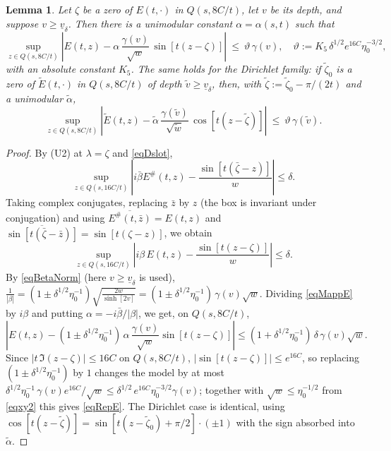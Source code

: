 \documentclass[11pt,twoside,reqno]{amsart}
\def\ti{\tilde}
\def\d{\delta}
\def\l{\lambda}
\def\g{\gamma}
\def\a{\alpha}
\def\b{\beta}
\def\uv{\underline{v}_{\d}}
\theoremstyle{plain}
\newtheorem{lemma}{Lemma}
\numberwithin{equation}{section}
\begin{document}
\begin{lemma}\label{lemRep}
Let $\zeta$ be a zero of $E(t,\cdot)$ in $Q(s,8C/t)$, let $v$ be its depth, and suppose $v\geq\uv$. Then there is a unimodular constant $\a=\a(s,t)$ such that
\begin{equation}
\sup_{z\in Q(s,8C/t)}\left|E(t,z)-\a\,\frac{\g(v)}{\sqrt{w}}\,\sin[t(z-\zeta)]\right|\ \leq\ \vartheta\,\g(v),
\quad
\vartheta:=K_5\,\d^{1/2}e^{16C}\eta_0^{-3/2},
\label{eqRepE}
\end{equation}
with an absolute constant $K_5$. The same holds for the Dirichlet family: if $\ti\zeta_0$ is a zero of $\ti E(t,\cdot)$ in $Q(s,8C/t)$ of depth $\ti v\geq\uv$, then, with $\ti\zeta:=\ti\zeta_0-\pi/(2t)$ and a unimodular $\ti\a$,
\begin{equation}
\sup_{z\in Q(s,8C/t)}\left|\ti E(t,z)-\ti\a\,\frac{\g(\ti v)}{\sqrt{\ti w}}\,\cos[t(z-\ti\zeta)]\right|\ \leq\ \vartheta\,\g(\ti v).
\label{eqRepEt}
\end{equation}
\end{lemma}

\begin{proof}
By (U2) at $\l=\zeta$ and \eqref{eqDslot},
$$\sup_{z\in Q(s,16C/t)}\left|i\bar\b E^\#(t,z)-\frac{\sin[t(\bar\zeta-z)]}{w}\right|\leq\d .$$
Taking complex conjugates, replacing $\bar z$ by $z$ (the box is invariant under conjugation) and using $\overline{E^\#(t,\bar z)}=E(t,z)$ and $\overline{\sin[t(\bar\zeta-\bar z)]}=\sin[t(\zeta-z)]$, we obtain
\begin{equation}
\sup_{z\in Q(s,16C/t)}\left|i\b\,E(t,z)-\frac{\sin[t(z-\zeta)]}{w}\right|\leq\d .
\label{eqMappE}
\end{equation}
By \eqref{eqBetaNorm} (here $v\geq\uv$ is used), $\frac1{|\b|}=(1\pm\d^{1/2}\eta_0^{-1})\sqrt{\frac{2w}{\sinh[2v]}}=(1\pm\d^{1/2}\eta_0^{-1})\,\g(v)\sqrt w$. Dividing \eqref{eqMappE} by $i\b$ and putting $\a=-i\bar\b/|\b|$, we get, on $Q(s,8C/t)$,
$$\left|E(t,z)-(1\pm\d^{1/2}\eta_0^{-1})\,\a\,\frac{\g(v)}{\sqrt w}\sin[t(z-\zeta)]\right|\leq(1+\d^{1/2}\eta_0^{-1})\,\d\,\g(v)\sqrt w .$$
Since $|t\,\Im(z-\zeta)|\leq16C$ on $Q(s,8C/t)$, $\left|\sin[t(z-\zeta)]\right|\leq e^{16C}$, so replacing $(1\pm\d^{1/2}\eta_0^{-1})$ by $1$ changes the model by at most $\d^{1/2}\eta_0^{-1}\,\g(v)e^{16C}/\sqrt w\leq\d^{1/2}\,e^{16C}\eta_0^{-3/2}\g(v)$; together with $\sqrt w\leq\eta_0^{-1/2}$ from \eqref{eqxy2} this gives \eqref{eqRepE}. The Dirichlet case is identical, using $\cos[t(z-\ti\zeta)]=\sin[t(z-\ti\zeta_0)+\pi/2]\cdot(\pm1)$ with the sign absorbed into $\ti\a$.
\end{proof}
\end{document}
